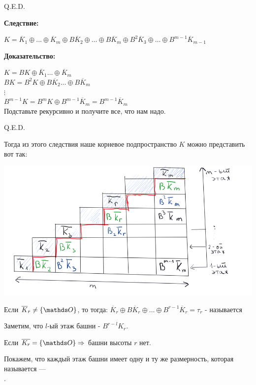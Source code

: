 \hfill Q.E.D.


\textbf{Следствие:}

$K = \overline{K}_1 \oplus \ldots \oplus \overline{K}_m \oplus B\overline{K}_2 \oplus \ldots \oplus B\overline{K}_m \oplus B^2\overline{K}_3  \oplus \ldots \oplus B^{m-1}\overline{K}_{m-1}$ 

\textbf{Доказательство:}


$K = BK \oplus \overline{K}_1\ldots \oplus \overline{K}_m$\\
$ BK = B^2K \oplus B\overline{K}_2\ldots \oplus B\overline{K}_m$\\
$\vdots$\\
$B^{m-1}K = B^m K \oplus B^{m-1}\overline{K}_m = B^{m-1} \overline{K}_m $\\
Подставьте рекурсивно и получите все, что нам надо.

\hfill Q.E.D.

Тогда из этого следствия наше корневое подпространство $K$ можно представить вот так:

\begin{center}
   \includegraphics[width = 15cm]{assets/7_9-zhordan-pyramide.png}
\end{center}

 Если $\overline{K}_r\neq \{\zero\}$, то тогда:
$\overline{K}_r \oplus B\overline{K}_r \oplus \ldots \oplus B^{r-1}\overline{K}_{r} = \tau_r$ - называется  

Заметим, что $l$-ый этаж башни - $B^{r-l} K_r$. 

 Если $\overline{K_r}=\{\zero\} \Rightarrow$ башни высоты $r$ нет.

Покажем, что каждый этаж башни имеет одну и ту же размерность, которая называется ---\\ .


